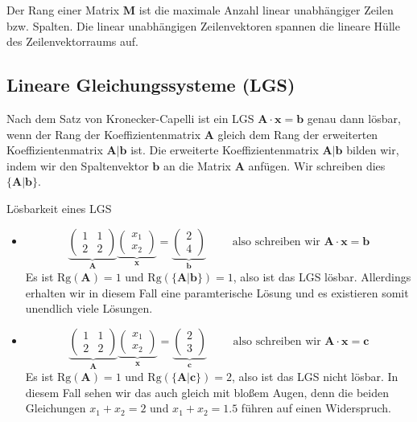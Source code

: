 Der Rang einer Matrix $\mathbf{M}$ ist die maximale Anzahl linear unabhängiger
Zeilen bzw. Spalten. Die linear unabhängigen Zeilenvektoren spannen die lineare
Hülle des Zeilenvektorraums auf.
%
\subsection{Lineare Gleichungssysteme (LGS)}
Nach dem Satz von Kronecker-Capelli ist ein LGS 
$\mathbf{A\cdot x}=\mathbf{b}$ genau dann lösbar, wenn der Rang der
Koeffizientenmatrix $\mathbf{A}$ gleich dem Rang der erweiterten
Koeffizientenmatrix $\mathbf{A|b}$ ist. Die erweiterte Koeffizientenmatrix
$\mathbf{A|b}$ bilden wir, indem wir den Spaltenvektor $\mathbf{b}$ an die
Matrix $\mathbf{A}$ anfügen. Wir schreiben dies $\mathbf{\{A|b\}}$.
\begin{example}{Lösbarkeit eines LGS}
  \begin{itemize}
    \item
      \[
	\underbrace{\begin{pmatrix}1&1\\2&2\end{pmatrix}}_{\mathbf{A}}
        \underbrace{\begin{pmatrix}x_1\\x_2\end{pmatrix}}_{\mathbf{x}}=
        \underbrace{\begin{pmatrix}2\\4\end{pmatrix}}_{\mathbf{b}}
	\qquad\text{ also schreiben wir }\mathbf{A\cdot x}=\mathbf{b}
      \]
      Es ist $\text{Rg}(\mathbf{A})=1$ und $\text{Rg}(\mathbf{\{A|b\}})=1$,
      also ist das LGS lösbar. Allerdings erhalten wir in diesem Fall eine
      paramterische Lösung und es existieren somit unendlich viele Lösungen.
    \item
       \[
        \underbrace{\begin{pmatrix}1&1\\2&2\end{pmatrix}}_{\mathbf{A}}
        \underbrace{\begin{pmatrix}x_1\\x_2\end{pmatrix}}_{\mathbf{x}}=
        \underbrace{\begin{pmatrix}2\\3\end{pmatrix}}_{\mathbf{c}}
        \qquad\text{ also schreiben wir }\mathbf{A\cdot x}=\mathbf{c}
      \]
      Es ist $\text{Rg}(\mathbf{A})=1$ und $\text{Rg}(\mathbf{\{A|c\}})=2$,
      also ist das LGS nicht lösbar. In diesem Fall sehen wir das auch gleich
      mit bloßem Augen, denn die beiden Gleichungen $x_1+x_2=2$ und
      $x_1+x_2=1.5$ führen auf einen Widerspruch.


\end{itemize}
\end{example}
